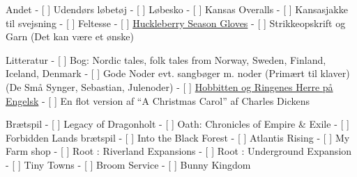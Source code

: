 Andet - {[} {]} Udendørs løbetøj - {[} {]} Løbesko - {[} {]} Kansas
Overalls - {[} {]} Kansasjakke til svejsning - {[} {]} Feltesse - {[}
{]}
\href{https://huckberry.com/store/giver/category/p/44207-4-season-glove-w-wax-coating}{Huckleberry
Season Gloves} - {[} {]} Strikkeopskrift og Garn (Det kan være et ønske)

Litteratur - {[} {]} Bog: Nordic tales, folk tales from Norway, Sweden,
Finland, Iceland, Denmark - {[} {]} Gode Noder evt. sangbøger m. noder
(Primært til klaver) (De Små Synger, Sebastian, Julenoder) - {[} {]}
\href{https://www.saxo.com/dk/the-hobbit-the-lord-of-the-rings-boxed-set_hardback_9780008376109}{Hobbitten
og Ringenes Herre på Engelsk} - {[} {]} En flot version af ``A Christmas
Carol'' af Charles Dickens

Brætspil - {[} {]} Legacy of Dragonholt - {[} {]} Oath: Chronicles of
Empire \& Exile - {[} {]} Forbidden Lands brætspil - {[} {]} Into the
Black Forest - {[} {]} Atlantis Rising - {[} {]} My Farm shop - {[} {]}
Root : Riverland Expansions - {[} {]} Root : Underground Expansion - {[}
{]} Tiny Towns - {[} {]} Broom Service - {[} {]} Bunny Kingdom
